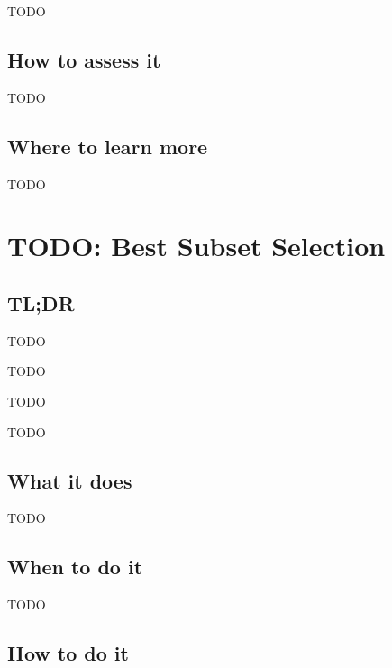 \documentclass[
]{book}
\providecommand{\tightlist}{%
  \setlength{\itemsep}{0pt}\setlength{\parskip}{0pt}}
\begin{document}
TODO

\hypertarget{how-to-assess-it-10}{%
\section{How to assess it}\label{how-to-assess-it-10}}

TODO

\hypertarget{where-to-learn-more-10}{%
\section{Where to learn more}\label{where-to-learn-more-10}}

TODO

\hypertarget{best-subset-selection}{%
\chapter{TODO: Best Subset Selection}\label{best-subset-selection}}

\hypertarget{tldr-11}{%
\section{TL;DR}\label{tldr-11}}

\begin{description}
\tightlist
\item[What it does]
TODO
\item[When to do it]
TODO
\item[How to do it]
TODO
\item[How to assess it]
TODO
\end{description}

\hypertarget{what-it-does-11}{%
\section{What it does}\label{what-it-does-11}}

TODO

\hypertarget{when-to-do-it-11}{%
\section{When to do it}\label{when-to-do-it-11}}

TODO

\hypertarget{how-to-do-it-11}{%
\section{How to do it}\label{how-to-do-it-11}}
\end{document}

